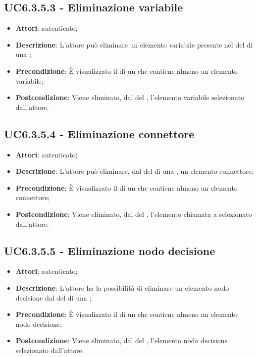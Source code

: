 \subsection{UC6.3.5.3 - Eliminazione variabile}
\label{ssec:UC6.3.5.3}
\begin{itemize}
\item \textbf{Attori}:  autenticato;
\item \textbf{Descrizione}: L'attore può eliminare un elemento variabile presente nel  del  di una ;
\item \textbf{Precondizione}: È visualizzato il  di un  che contiene almeno un elemento variabile;
\item \textbf{Postcondizione}: Viene eliminato, dal  del ,  l'elemento variabile selezionato dall'attore.
\end{itemize}
\subsection{UC6.3.5.4 - Eliminazione connettore}
\label{ssec:UC6.3.5.4}
\begin{itemize}
\item \textbf{Attori}:  autenticato;
\item \textbf{Descrizione}: L'attore può eliminare, dal  del  di una , un elemento connettore;
\item \textbf{Precondizione}: È visualizzato il  di un  che contiene almeno un elemento connettore;
\item \textbf{Postcondizione}: Viene eliminato, dal  del ,  l'elemento chiamata a  selezionato dall'attore.
\end{itemize}
\subsection{UC6.3.5.5 - Eliminazione nodo decisione}
\label{ssec:UC6.3.5.5}
\begin{itemize}
\item \textbf{Attori}:  autenticato;
\item \textbf{Descrizione}: L'attore ha la possibilità di eliminare un elemento nodo decisione dal  del  di una ;
\item \textbf{Precondizione}: È visualizzato il  di un  che contiene almeno un elemento nodo decisione;
\item \textbf{Postcondizione}: Viene eliminato, dal  del ,  l'elemento nodo decisione selezionato dall'attore.
\end{itemize}
